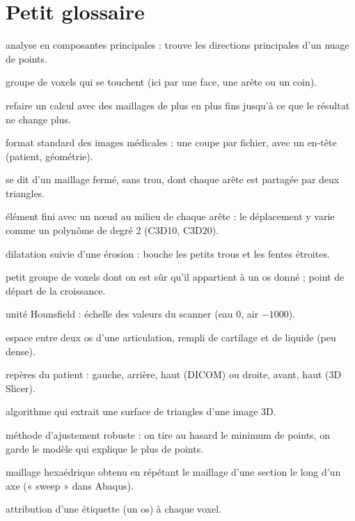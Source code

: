 \documentclass[11pt,a4paper]{article}
\begin{document}
\section{Petit glossaire}

\begin{description}[style=nextline, leftmargin=1.2cm, itemsep=1pt]
  \item[ACP] analyse en composantes principales : trouve les directions principales d'un nuage de points.
  \item[Composante connexe] groupe de voxels qui se touchent (ici par une face, une arête ou un coin).
  \item[Convergence (étude de)] refaire un calcul avec des maillages de plus en plus fins jusqu'à ce que le résultat ne
  change plus.
  \item[DICOM] format standard des images médicales : une coupe par fichier, avec un en-tête (patient, géométrie).
  \item[Étanche] se dit d'un maillage fermé, sans trou, dont chaque arête est partagée par deux triangles.
  \item[Élément quadratique] élément fini avec un nœud au milieu de chaque arête : le déplacement y varie comme un
  polynôme de degré 2 (C3D10, C3D20).
  \item[Fermeture morphologique] dilatation suivie d'une érosion : bouche les petits trous et les fentes étroites.
  \item[Graine] petit groupe de voxels dont on est sûr qu'il appartient à un os donné ; point de départ de la croissance.
  \item[HU] unité Hounsfield : échelle des valeurs du scanner (eau 0, air $-1000$).
  \item[Interligne] espace entre deux os d'une articulation, rempli de cartilage et de liquide (peu dense).
  \item[LPS, RAS] repères du patient : gauche, arrière, haut (DICOM) ou droite, avant, haut (3D Slicer).
  \item[Marching cubes] algorithme qui extrait une surface de triangles d'une image 3D.
  \item[RANSAC] méthode d'ajustement robuste : on tire au hasard le minimum de points, on garde le modèle qui
  explique le plus de points.
  \item[Maillage balayé] maillage hexaédrique obtenu en répétant le maillage d'une section le long d'un axe
  (« sweep » dans Abaqus).
  \item[Segmentation] attribution d'une étiquette (un os) à chaque voxel.

\end{description}
\end{document}
